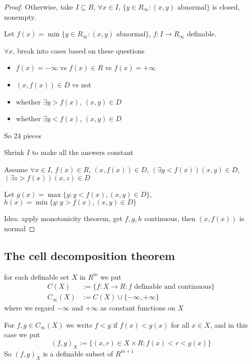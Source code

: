 \documentclass[11pt]{article}
\begin{document}
\begin{proof}
Otherwise, take \(I\subseteq B\), \(\forall x\in I\), \(\{y\in R_\infty:(x,y)\text{ abnormal}\}\) is closed, nonempty.

Let \(f(x)=\min\{y\in R_\infty:(x,y)\text{ abnormal}\}\), \(f:I\to R_\infty\) definable.

\(\forall x\), break into cases based on these questions
\begin{itemize}
\item \(f(x)=-\infty\) vs \(f(x)\in R\) vs \(f(x)=+\infty\)
\item \((x,f(x))\in D\) vs not
\item whether \(\exists y>f(x)\), \((x,y)\in D\)
\item whether \(\exists y<f(x)\), \((x,y)\in D\)
\end{itemize}

So 24 pieces

Shrink \(I\) to make all the answers constant

Assume \(\forall x\in I\), \(f(x)\in R\), \((x,f(x))\in D\), \((\exists y<f(x))(x,y)\in D\), \((\exists z>f(x))(x,z)\in D\)

Let \(g(x)=\max\{y:y<f(x), (x,y)\in D\}\), \(h(x)=\min\{y:y>f(x),(x,y)\in D\}\)

Idea: apply monotonicity theorem, get \(f,g,h\) continuous, then \((x,f(x))\) is normal
\end{proof}




\subsection{The cell decomposition theorem}
\label{sec:orgc63ff5d}
for each definable set \(X\) in \(R^m\) we put
\begin{align*}
C(X)&:=\{f:X\to R:f\text{ definable and continuous}\}\\
C_\infty(X)&:=C(X)\cup\{-\infty,+\infty\}
\end{align*}
where we regard \(-\infty\) and \(+\infty\) as constant functions on \(X\)

For \(f,g\in C_\infty(X)\) we write \(f<g\) if \(f(x)<g(x)\) for all \(x\in X\), and in this case we put
\begin{equation*}
(f,g)_X:=\{(x,r)\in X\times R:f(x)<r<g(x)\}
\end{equation*}
So \((f,g)_X\) is a definable subset of \(R^{m+1}\)
\end{document}
